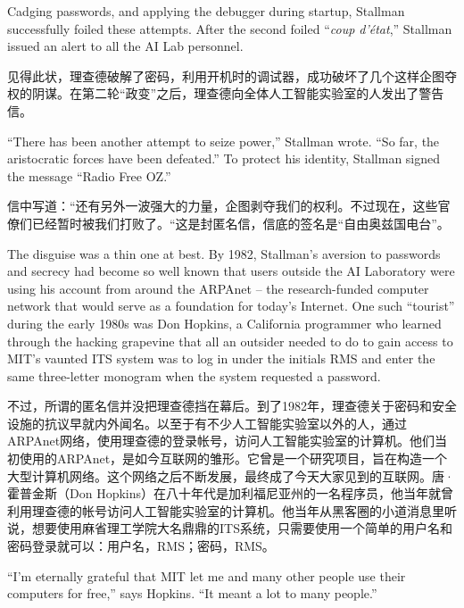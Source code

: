 \ifdefined\eng
Cadging passwords, and applying the debugger during startup, Stallman successfully foiled these attempts. After the second foiled ``\textit{coup d'état},'' Stallman issued an alert to all the AI Lab personnel.
\fi

\ifdefined\chs
见得此状，理查德破解了密码，利用开机时的调试器，成功破坏了几个这样企图夺权的阴谋。在第二轮“政变”之后，理查德向全体人工智能实验室的人发出了警告信。
\fi

\ifdefined\eng
``There has been another attempt to seize power,'' Stallman wrote. ``So far, the aristocratic forces have been defeated.'' To protect his identity, Stallman signed the message ``Radio Free OZ.''
\fi

\ifdefined\chs
信中写道：“还有另外一波强大的力量，企图剥夺我们的权利。不过现在，这些官僚们已经暂时被我们打败了。“这是封匿名信，信底的签名是“自由奥兹国电台”。
\fi

\ifdefined\eng
The disguise was a thin one at best. By 1982, Stallman's aversion to passwords and secrecy had become so well known that users outside the AI Laboratory were using his account from around the ARPAnet -- the research-funded computer network that would serve as a foundation for today's Internet. One such ``tourist'' during the early 1980s was Don Hopkins, a California programmer who learned through the hacking grapevine that all an outsider needed to do to gain access to MIT's vaunted ITS system was to log in under the initials RMS and enter the same three-letter monogram when the system requested a password.
\fi

\ifdefined\chs
不过，所谓的匿名信并没把理查德挡在幕后。到了1982年，理查德关于密码和安全设施的抗议早就内外闻名。以至于有不少人工智能实验室以外的人，通过ARPAnet网络，使用理查德的登录帐号，访问人工智能实验室的计算机。他们当初使用的ARPAnet，是如今互联网的雏形。它曾是一个研究项目，旨在构造一个大型计算机网络。这个网络之后不断发展，最终成了今天大家见到的互联网。唐·霍普金斯（Don Hopkins）在八十年代是加利福尼亚州的一名程序员，他当年就曾利用理查德的帐号访问人工智能实验室的计算机。他当年从黑客圈的小道消息里听说，想要使用麻省理工学院大名鼎鼎的ITS系统，只需要使用一个简单的用户名和密码登录就可以：用户名，RMS；密码，RMS。
\fi

\ifdefined\eng
``I'm eternally grateful that MIT let me and many other people use their computers for free,'' says Hopkins. ``It meant a lot to many people.''
\fi

